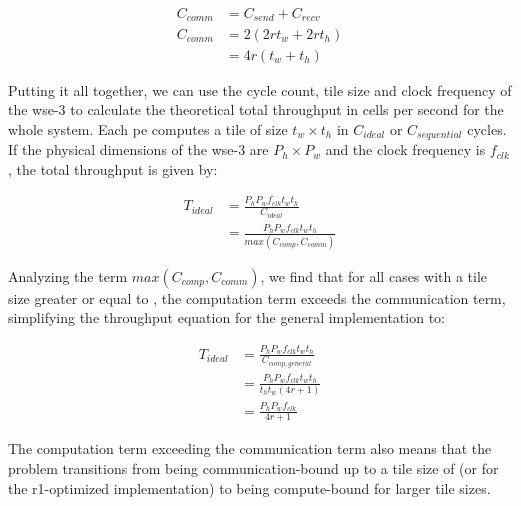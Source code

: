 \begin{equation}
    \label{eq:c_comm}
    \begin{aligned}
        C_{comm} &= C_{send} + C_{recv} \\
        C_{comm} &= 2\left(2 r t_w + 2 r t_h\right) \\
        &= 4r\left(t_w+t_h\right)
    \end{aligned}
\end{equation}

Putting it all together, we can use the cycle count, tile size and clock frequency of the \ac{wse}-3 to calculate the theoretical total throughput in cells per second for the whole system. Each \ac{pe} computes a tile of size $t_w \times t_h$ in $C_{ideal}$ or $C_{sequential}$ cycles. If the physical dimensions of the \ac{wse}-3 are $P_h \times P_w$ and the clock frequency is $f_{clk}$, the total throughput is given by:

\begin{equation}
    \label{eq:throughput_ideal}
    \begin{aligned}
        T_{ideal} &= \frac{P_h P_w f_{clk} t_w t_h}{C_{ideal}} \\
        &= \frac{P_h P_w f_{clk} t_w t_h}{max\left(C_{comp}, C_{comm}\right)}
    \end{aligned}
\end{equation}

Analyzing the term $max\left(C_{comp}, C_{comm}\right)$, we find that for all cases with a tile size greater or equal to , the computation term exceeds the communication term, simplifying the throughput equation for the general implementation to:

\begin{equation}
    \label{eq:throughput_ideal_simplified}
    \begin{aligned}
        T_{ideal} &= \frac{P_h P_w f_{clk} t_w t_h}{C_{comp,general}} \\
        &= \frac{P_h P_w f_{clk} t_w t_h}{t_h t_w \left(4r + 1\right)} \\
        &= \frac{P_h P_w f_{clk}}{4r + 1}
    \end{aligned}
\end{equation}

The computation term exceeding the communication term also means that the problem transitions from being communication-bound up to a tile size of  (or  for the r1-optimized implementation) to being compute-bound for larger tile sizes.


